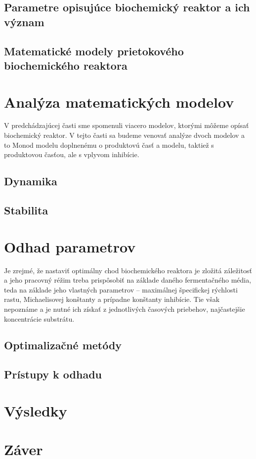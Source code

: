 \documentclass[fleqn]{article}
\begin{document}
\subsection{Parametre opisujúce biochemický reaktor a ich význam}


\subsection{Matematické modely prietokového biochemického reaktora}


\section{Analýza matematických modelov}
V predchádzajúcej časti sme spomenuli viacero modelov, ktorými môžeme opísať biochemický reaktor. V tejto časti sa budeme venovať analýze dvoch modelov a to Monod modelu doplnenému o produktovú časť a modelu, taktiež s produktovou časťou, ale s vplyvom inhibície.

\subsection{Dynamika}


\subsection{Stabilita}


\section{Odhad parametrov}
Je zrejmé, že nastaviť optimálny chod biochemického reaktora je zložitá záležitosť a jeho pracovný réžim treba prispôsobiť na základe daného fermentačného média, teda na základe jeho vlastných parametrov -- maximálnej špecifickej rýchlosti rastu, Michaelisovej konštanty a prípadne konštanty inhibície. Tie však nepoznáme a je nutné ich získať z jednotlivých časových priebehov, najčastejšie koncentrácie substrátu.

\subsection{Optimalizačné metódy}


\subsection{Prístupy k odhadu}


\section{Výsledky}


\section{Záver}


\newpage


\end{document}
